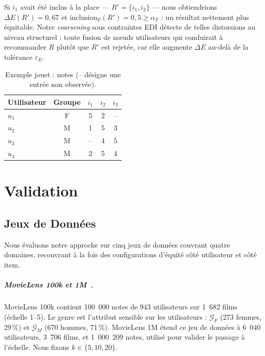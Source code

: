 \documentclass[12pt]{report}
\begin{document}
Si $i_1$ avait été inclus à la place --- $R' = \{i_1, i_2\}$ --- nous
obtiendrions $\Delta E(R') = 0{,}67$ et $\mathrm{inclusion}_F(R') = 0{,}5
\geq \alpha_F$ : un résultat nettement plus équitable. Notre
\emph{coarsening} sous contraintes EDI détecte de telles distorsions au
niveau structurel : toute fusion de nœuds utilisateurs qui conduirait à
recommander $R$ plutôt que $R'$ est rejetée, car elle augmente $\Delta E$
au-delà de la tolérance $\varepsilon_E$.

\begin{table}[H]
\centering
\caption{Exemple jouet : notes (-- désigne une entrée non observée).}
\label{tab:toy}
\begin{tabular}{lcccc}
\hline
Utilisateur & Groupe & $i_1$ & $i_2$ & $i_3$ \\
\hline
$u_1$ & F & 5  & 2  & --  \\
$u_2$ & M & 1  & 5  & 3   \\
$u_3$ & M & -- & 4  & 5   \\
$u_4$ & M & 2  & 5  & 4   \\
\hline
\end{tabular}
\end{table}

\chapter{Validation}
\label{chap:validation}
\label{sec:experimentation}

\section{Jeux de Données}

Nous évaluons notre approche sur cinq jeux de données couvrant quatre
domaines, recouvrant à la fois des configurations d'équité côté
utilisateur et côté item.

\paragraph{MovieLens 100k et 1M~\cite{harper2015movielens}.}
MovieLens 100k contient 100~000 notes de 943 utilisateurs sur 1~682
films (échelle 1--5). Le genre est l'attribut sensible sur les
utilisateurs : $\mathcal{G}_F$ (273 femmes, 29\,\%) et $\mathcal{G}_M$
(670 hommes, 71\,\%). MovieLens 1M étend ce jeu de données à 6~040
utilisateurs, 3~706 films, et 1~000~209 notes, utilisé pour valider le
passage à l'échelle. Nous fixons $k \in \{5, 10, 20\}$.
\end{document}
